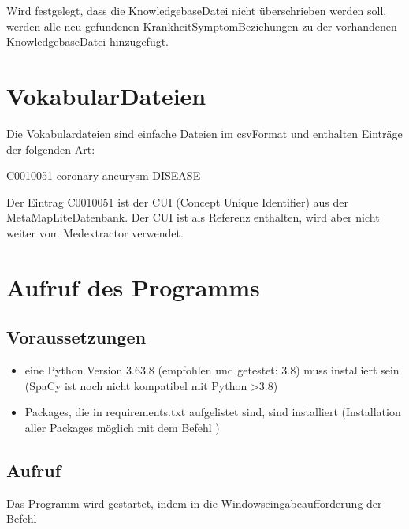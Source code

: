\documentclass[letterpaper,10pt,english]{sphinxmanual}
\begin{document}
\sphinxAtStartPar
Wird festgelegt, dass die Knowledgebase\sphinxhyphen{}Datei nicht überschrieben werden
soll, werden alle neu gefundenen Krankheit\sphinxhyphen{}Symptom\sphinxhyphen{}Beziehungen zu der
vorhandenen Knowledgebase\sphinxhyphen{}Datei hinzugefügt.


\chapter{Vokabular\sphinxhyphen{}Dateien}
\label{\detokenize{readme:vokabular-dateien}}
\sphinxAtStartPar
Die Vokabulardateien sind einfache Dateien im csv\sphinxhyphen{}Format und enthalten
Einträge der folgenden Art:

\sphinxAtStartPar
C0010051 coronary aneurysm DISEASE

\sphinxAtStartPar
Der Eintrag C0010051 ist der CUI (Concept Unique Identifier) aus der
MetaMapLite\sphinxhyphen{}Datenbank. Der CUI ist als Referenz enthalten, wird aber
nicht weiter vom Medextractor verwendet.


\chapter{Aufruf des Programms}
\label{\detokenize{readme:aufruf-des-programms}}

\section{Voraussetzungen}
\label{\detokenize{readme:voraussetzungen}}\begin{itemize}
\item {} 
\sphinxAtStartPar
eine Python Version 3.6\sphinxhyphen{}3.8 (empfohlen und getestet: 3.8) muss
installiert sein (SpaCy ist noch nicht kompatibel mit Python \textgreater{}3.8)

\item {} 
\sphinxAtStartPar
Packages, die in requirements.txt aufgelistet sind, sind installiert
(Installation aller Packages möglich mit dem Befehl
)

\end{itemize}


\section{Aufruf}
\label{\detokenize{readme:aufruf}}
\sphinxAtStartPar
Das Programm wird gestartet, indem in die Windowseingabeaufforderung der
Befehl
\end{document}
